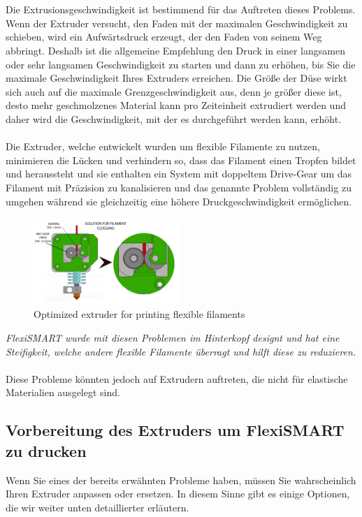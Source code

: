 \documentclass[11pt,a4paper]{article}
\begin{document}
\\\\
Die Extrusionsgeschwindigkeit ist bestimmend für das Auftreten dieses Problems. Wenn der Extruder versucht, den Faden mit der maximalen Geschwindigkeit zu schieben, wird ein Aufwärtsdruck erzeugt, der den Faden von seinem Weg abbringt. Deshalb ist die allgemeine Empfehlung den Druck in einer langsamen oder sehr langsamen Geschwindigkeit zu starten und dann zu erhöhen, bis Sie die maximale Geschwindigkeit Ihres Extruders erreichen. Die Größe der Düse wirkt sich auch auf die maximale Grenzgeschwindigkeit aus, denn je größer diese ist, desto mehr geschmolzenes Material kann pro Zeiteinheit extrudiert werden und daher wird die Geschwindigkeit, mit der es durchgeführt werden kann, erhöht.
\\\\
Die Extruder, welche entwickelt wurden um flexible Filamente zu nutzen, minimieren die Lücken und verhindern so, dass das Filament einen Tropfen bildet und heraussteht und sie enthalten ein System mit doppeltem Drive-Gear um das Filament mit Präzision zu kanalisieren und das genannte Problem vollständig zu umgehen während sie gleichzeitig eine höhere Druckgeschwindigkeit ermöglichen.
\begin{figure}[H]
\centering
\includegraphics[width=0.5\textwidth,cfbox=azul_marcos 4pt 0pt]{FOTOS/NUDOS2}
\caption*{Optimized extruder for printing flexible filaments}
\end{figure}
\emph{FlexiSMART wurde mit diesen Problemen im Hinterkopf designt und hat eine Steifigkeit, welche andere flexible Filamente überragt und hilft diese zu reduzieren.}
\\\\
Diese Probleme könnten jedoch auf Extrudern auftreten, die nicht für elastische Materialien ausgelegt sind.
	\subsection{Vorbereitung des Extruders um FlexiSMART zu drucken}Wenn Sie eines der bereits erwähnten Probleme haben, müssen Sie wahrscheinlich Ihren Extruder anpassen oder ersetzen. In diesem Sinne gibt es einige Optionen, die wir weiter unten detaillierter erläutern.
\end{document}
